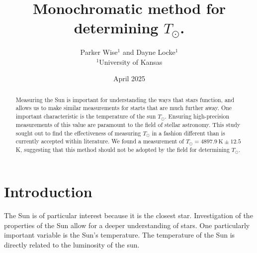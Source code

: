 \documentclass[%
 reprint,
 amsmath,amssymb,
 aps,
 10pt
]{revtex4-2}
\begin{document}
\begin{abstract}
	Measuring the Sun is important for understanding the ways that stars function, and allows us to make similar measurements for starts that are much further away. One important characteristic is the temperature of the sun $T_\odot$. Ensuring high-precision measurements of this value are paramount to the field of stellar astronomy. This study sought out to find the effectiveness of measuring $T_\odot$ in a fashion different than is currently accepted within literature. We found a measurement of $T_\odot = \SI{4897.9}{\kelvin} \pm 12.5$ K, suggesting that this method should not be adopted by the field for determining $T_\odot$.
\end{abstract}
\title[title]{Monochromatic method for determining $T_\odot$.}
\author{Parker Wise$^{1}$ and Dayne Locke$^{1}$\\$^{1}$University of Kansas}
\date{April 2025}
\maketitle
\showthe\textwidth
\section{Introduction}
The Sun is of particular interest because it is the closest star. Investigation of the properties of the Sun allow for a deeper understanding of stars. One particularly important variable is the Sun's temperature. The temperature of the Sun is directly related to the luminosity of the sun. 
\end{document}
